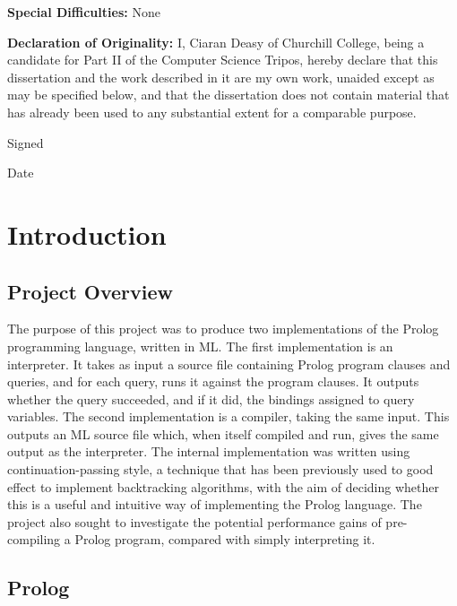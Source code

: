 \documentclass[12pt]{article}
\begin{document}
\vspace{0.25in}

{\bf Special Difficulties:} None

{\bf Declaration of Originality:}
I, Ciaran Deasy of Churchill College, being a candidate for Part II of the Computer Science Tripos, hereby declare that this dissertation and the work described in it are my own work, unaided except as may be specified below, and that the dissertation does not contain material that has already been used to any substantial extent for a comparable purpose. 

Signed %

Date %

\vfil
\eject


\newpage

\section{Introduction}


\subsection{Project Overview}

The purpose of this project was to produce two implementations of the Prolog programming language, written in ML. 
The first implementation is an interpreter.
It takes as input a source file containing Prolog program clauses and queries, and for each query, runs it against the program clauses. 
It outputs whether the query succeeded, and if it did, the bindings assigned to query variables.
The second implementation is a compiler, taking the same input. 
This outputs an ML source file which, when itself compiled and run, gives the same output as the interpreter.
The internal implementation was written using continuation-passing style, a technique that has been previously used to good effect to implement backtracking algorithms, with the aim of deciding whether this is a useful and intuitive way of implementing the Prolog language. 
The project also sought to investigate the potential performance gains of pre-compiling a Prolog program, compared with simply interpreting it.

\subsection{Prolog}
\end{document}
